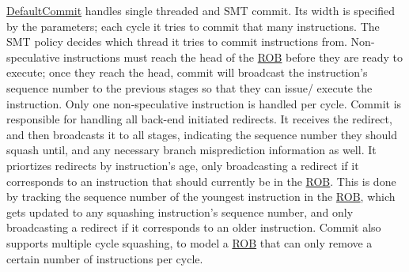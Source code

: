 \hyperlink{classDefaultCommit}{DefaultCommit} handles single threaded and SMT commit. Its width is specified by the parameters; each cycle it tries to commit that many instructions. The SMT policy decides which thread it tries to commit instructions from. Non-\/ speculative instructions must reach the head of the \hyperlink{classROB}{ROB} before they are ready to execute; once they reach the head, commit will broadcast the instruction's sequence number to the previous stages so that they can issue/ execute the instruction. Only one non-\/speculative instruction is handled per cycle. Commit is responsible for handling all back-\/end initiated redirects. It receives the redirect, and then broadcasts it to all stages, indicating the sequence number they should squash until, and any necessary branch misprediction information as well. It priortizes redirects by instruction's age, only broadcasting a redirect if it corresponds to an instruction that should currently be in the \hyperlink{classROB}{ROB}. This is done by tracking the sequence number of the youngest instruction in the \hyperlink{classROB}{ROB}, which gets updated to any squashing instruction's sequence number, and only broadcasting a redirect if it corresponds to an older instruction. Commit also supports multiple cycle squashing, to model a \hyperlink{classROB}{ROB} that can only remove a certain number of instructions per cycle. 

